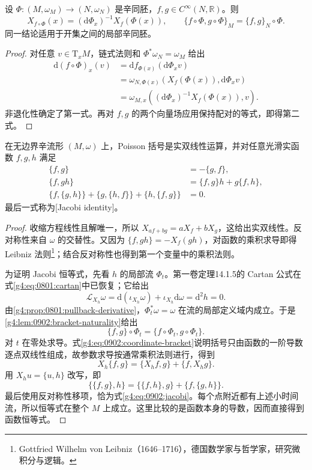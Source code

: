 \begin{lemma}\label{g4:lem:0902:bracket-naturality}
	设 \(\Phi:(M,\omega_M)\to(N,\omega_N)\) 是辛同胚，\(f,g\in C^\infty(N,\mathbb R)\)。则
	\begin{equation}\label{g4:eq:0902:bracket-naturality}
		X_{f\circ\Phi}(x)
		=(\mathrm{d}\Phi_x)^{-1}X_f(\Phi(x)),
		\qquad
		\{f\circ\Phi,g\circ\Phi\}_M=\{f,g\}_N\circ\Phi.
	\end{equation}
	同一结论适用于开集之间的局部辛同胚。
\end{lemma}
\begin{proof}
	对任意 \(v\in\mathrm{T}_xM\)，链式法则和 \(\Phi^*\omega_N=\omega_M\) 给出
	\[
		\begin{aligned}
			\mathrm{d}(f\circ\Phi)_x(v)
			&=\mathrm{d}f_{\Phi(x)}(\mathrm{d}\Phi_xv)\\
			&=\omega_{N,\Phi(x)}(X_f(\Phi(x)),\mathrm{d}\Phi_xv)\\
			&=\omega_{M,x}((\mathrm{d}\Phi_x)^{-1}X_f(\Phi(x)),v).
		\end{aligned}
	\]
	非退化性确定了第一式。再对 \(f,g\) 的两个向量场应用保持配对的等式，即得第二式。
\end{proof}

\begin{theorem}\label{g4:thm:0902:poisson-identities}
	在无边界辛流形 \((M,\omega)\) 上，Poisson 括号是实双线性运算，并对任意光滑实函数 \(f,g,h\) 满足
	\begin{align}
		\{f,g\}&=-\{g,f\},\label{g4:eq:0902:antisymmetry}\\
		\{f,gh\}&=\{f,g\}h+g\{f,h\},\label{g4:eq:0902:leibniz}\\
		\{f,\{g,h\}\}+\{g,\{h,f\}\}+\{h,\{f,g\}\}&=0.
		\label{g4:eq:0902:jacobi}
	\end{align}
	最后一式称为[Jacobi identity]。
\end{theorem}
\begin{proof}
	收缩方程线性且解唯一，所以 \(X_{af+bg}=aX_f+bX_g\)，这给出实双线性。反对称性来自 \(\omega\) 的交替性。又因为 \(\{f,gh\}=-X_f(gh)\)，对函数的乘积求导即得 Leibniz 法则\footnote{Gottfried Wilhelm von Leibniz（1646--1716），德国数学家与哲学家，研究微积分与逻辑。}；结合反对称性也得到第一个变量中的乘积法则。

	为证明 Jacobi 恒等式，先看 \(h\) 的局部流 \(\Phi_t\)。第一卷定理14.1.5的 Cartan 公式在式\eqref{g4:eq:0801:cartan}中已恢复；它给出
	\[
		\mathcal L_{X_h}\omega
		=\mathrm{d}(\iota_{X_h}\omega)+\iota_{X_h}\mathrm{d}\omega
		=\mathrm{d}^2h=0.
	\]
	由\cref{g4:prop:0801:pullback-derivative}，\(\Phi_t^*\omega=\omega\) 在流的局部定义域内成立。于是\cref{g4:lem:0902:bracket-naturality}给出
	\[
		\{f,g\}\circ\Phi_t=\{f\circ\Phi_t,g\circ\Phi_t\}.
	\]
	对 \(t\) 在零处求导。式\eqref{g4:eq:0902:coordinate-bracket}说明括号只由函数的一阶导数逐点双线性组成，故参数求导按通常乘积法则进行，得到
	\[
		X_h\{f,g\}=\{X_hf,g\}+\{f,X_hg\}.
	\]
	用 \(X_hu=\{u,h\}\) 改写，即
	\[
		\{\{f,g\},h\}=\{\{f,h\},g\}+\{f,\{g,h\}\}.
	\]
	最后使用反对称性移项，恰为式\eqref{g4:eq:0902:jacobi}。每个点附近都有上述小时间流，所以恒等式在整个 \(M\) 上成立。这里比较的是函数本身的导数，因而直接得到函数恒等式。
\end{proof}

